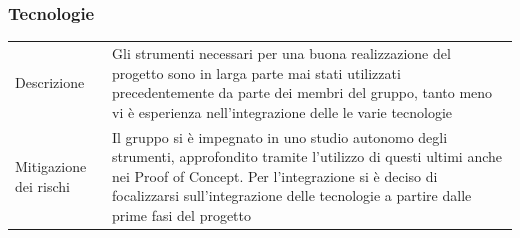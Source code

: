 \documentclass{article}
\begin{document}
\subsubsection{Tecnologie}\begin{center}
\begin{tabular}{P{10em} P{20em}} 
     Descrizione & Gli strumenti necessari per una buona realizzazione del progetto sono in larga parte mai stati utilizzati precedentemente da parte dei membri del gruppo, tanto meno vi è esperienza nell'integrazione delle le varie tecnologie\\ 
    Mitigazione dei rischi & Il gruppo si è impegnato in uno studio autonomo degli strumenti, approfondito tramite l'utilizzo di questi ultimi anche nei Proof of Concept. Per l'integrazione si è deciso di focalizzarsi sull'integrazione delle tecnologie a partire dalle prime fasi del progetto\\
\end{tabular}
\label{tab:mittecnologie}
\end{center}
\end{document}
